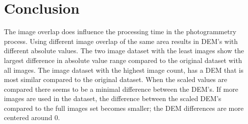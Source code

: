 \documentclass{isprs} %
\begin{document}
\section{Conclusion}
The image overlap does influence the processing time in the photogrammetry process.
Using different image overlap of the same area results in DEM's with different absolute values.
The two image dataset with the least images show the largest difference in absolute value range compared to the original dataset with all images. 
The image dataset with the highest image count, has a DEM that is most similar compared to the original dataset.
When the scaled values are compared there seems to be a minimal difference between the DEM's.
If more images are used in the dataset, the difference between the scaled DEM's compared to the full images set becomes smaller; the DEM differences are more centered around 0.


\sloppy




{
	\begin{spacing}{1.17}
		\normalsize
	\end{spacing}
}



\vspace{1cm}
\end{document}
